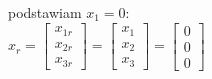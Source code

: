 podstawiam $x_1=0$:\\
$x_r=\left[ \begin{array}{c}   x_{1r}\\ x_{2r}\\x_{3r}   \end{array}\right]
=\left[ \begin{array}{c}   x_{1}\\ x_{2}\\x_{3}   \end{array}\right]=\left[ \begin{array}{c}   0\\0\\0   \end{array}\right]$




\pagebreak
